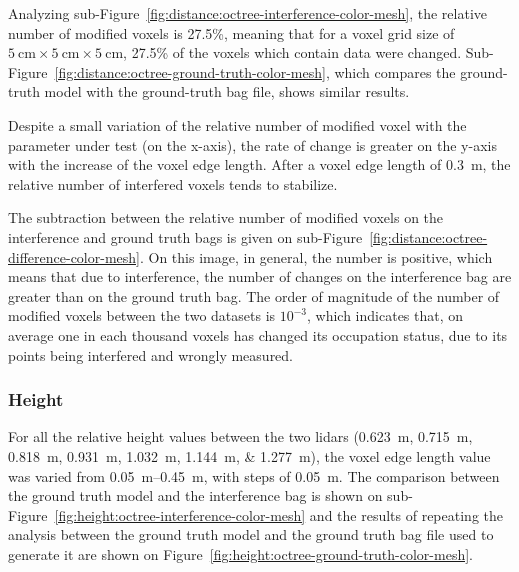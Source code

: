 Analyzing sub-Figure~\ref{fig:distance:octree-interference-color-mesh}, the relative number of modified voxels is 27.5\%, meaning that for a voxel grid size of $\SI{5}{\centi\meter}\times \SI{5}{\centi\meter}\times \SI{5}{\centi\meter}$, 27.5\% of the voxels which contain data were changed. Sub-Figure~\ref{fig:distance:octree-ground-truth-color-mesh}, which compares the ground-truth model with the ground-truth bag file, shows similar results.  

Despite a small variation of the relative number of modified voxel with the parameter under test (on the x-axis), the rate of change is greater on the y-axis with the increase of the voxel edge length. After a voxel edge length of \SI{0.3}{\meter}, the relative number of interfered voxels tends to stabilize. 

The subtraction between the relative number of modified voxels on the interference and ground truth bags is given on sub-Figure~\ref{fig:distance:octree-difference-color-mesh}. On this image, in general, the number is positive, which means that due to interference, the number of changes on the interference bag are greater than on the ground truth bag. The order of magnitude of the number of modified voxels between the two datasets is $10^{-3}$, which indicates that, on average one in each thousand voxels has changed its occupation status, due to its points being interfered and wrongly measured.


\subsubsection{Height}
For all the relative height values between the two \acp{lidar} (\SIlist[list-units=single]{0.623; 0.715; 0.818; 0.931; 1.032; 1.144; 1.277}{\meter}), the voxel edge length value was varied from \SIrange{0.05}{0.45}{\meter}, with steps of \SI{0.05}{\meter}. The comparison between the ground truth model and the interference bag is shown on sub-Figure~\ref{fig:height:octree-interference-color-mesh} and the results of repeating the analysis between the ground truth model and the ground truth bag file used to generate it are shown on Figure~\ref{fig:height:octree-ground-truth-color-mesh}.

